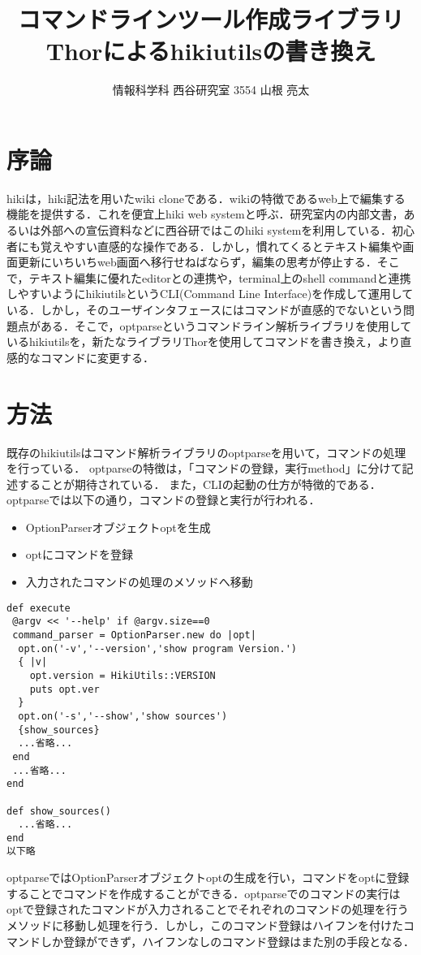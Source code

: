 \documentclass[a4j,twocolumn]{jsarticle}
\begin{document}
\title{コマンドラインツール作成ライブラリThorによるhikiutilsの書き換え}
\author{情報科学科 西谷研究室 3554 山根 亮太}
\date{}
\maketitle
\section{序論}
hikiは，hiki記法を用いたwiki cloneである．wikiの特徴であるweb上で編集する機能を提供する．これを便宜上hiki web systemと呼ぶ．研究室内の内部文書，あるいは外部への宣伝資料などに西谷研ではこのhiki systemを利用している．初心者にも覚えやすい直感的な操作である．しかし，慣れてくるとテキスト編集や画面更新にいちいちweb画面へ移行せねばならず，編集の思考が停止する．そこで，テキスト編集に優れたeditorとの連携や，terminal上のshell commandと連携しやすいようにhikiutilsというCLI(Command Line Interface)を作成して運用している．しかし，そのユーザインタフェースにはコマンドが直感的でないという問題点がある．そこで，optparseというコマンドライン解析ライブラリを使用しているhikiutilsを，新たなライブラリThorを使用してコマンドを書き換え，より直感的なコマンドに変更する．

\section{方法}
既存のhikiutilsはコマンド解析ライブラリのoptparseを用いて，コマンドの処理を行っている．
optparseの特徴は，「コマンドの登録，実行method」に分けて記述することが期待されている．
また，CLIの起動の仕方が特徴的である．
optparseでは以下の通り，コマンドの登録と実行が行われる．
\begin{itemize}
\item OptionParserオブジェクトoptを生成
\item optにコマンドを登録
\item 入力されたコマンドの処理のメソッドへ移動
\end{itemize}
\begin{verbatim}
def execute
 @argv << '--help' if @argv.size==0
 command_parser = OptionParser.new do |opt|
  opt.on('-v','--version','show program Version.') 
  { |v|
    opt.version = HikiUtils::VERSION
    puts opt.ver
  }
  opt.on('-s','--show','show sources')
  {show_sources}                
  ...省略...
 end
 ...省略...
end     
  
def show_sources()
  ...省略...
end
以下略
\end{verbatim}
optparseではOptionParserオブジェクトoptの生成を行い，コマンドをoptに登録することでコマンドを作成することができる．optparseでのコマンドの実行はoptで登録されたコマンドが入力されることでそれぞれのコマンドの処理を行うメソッドに移動し処理を行う．しかし，このコマンド登録はハイフンを付けたコマンドしか登録ができず，ハイフンなしのコマンド登録はまた別の手段となる．
\end{document}
